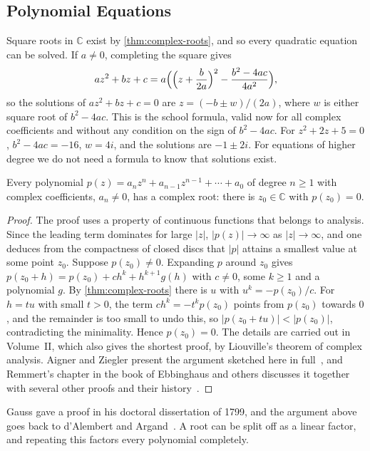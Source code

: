 \subsection{Polynomial Equations}

Square roots in $\mathbb C$ exist by \cref{thm:complex-roots}, and so every quadratic equation can be solved. If $a\ne0$, completing the square gives
\[
az^2+bz+c=a\Bigl(\Bigl(z+\frac b{2a}\Bigr)^2-\frac{b^2-4ac}{4a^2}\Bigr),
\]
so the solutions of $az^2+bz+c=0$ are $z=(-b\pm w)/(2a)$, where $w$ is either square root of $b^2-4ac$. This is the school formula, valid now for all complex coefficients and without any condition on the sign of $b^2-4ac$. For $z^2+2z+5=0$, $b^2-4ac=-16$, $w=4i$, and the solutions are $-1\pm2i$. For equations of higher degree we do not need a formula to know that solutions exist.

\begin{theorem}
\label{thm:fta}
Every polynomial $p(z)=a_nz^n+a_{n-1}z^{n-1}+\cdots+a_0$ of degree $n\ge1$ with complex coefficients, $a_n\ne0$, has a complex root: there is $z_0\in\mathbb C$ with $p(z_0)=0$.
\end{theorem}

\begin{proof}
The proof uses a property of continuous functions that belongs to analysis. Since the leading term dominates for large $|z|$, $|p(z)|\to\infty$ as $|z|\to\infty$, and one deduces from the compactness of closed discs that $|p|$ attains a smallest value at some point $z_0$. Suppose $p(z_0)\ne0$. Expanding $p$ around $z_0$ gives $p(z_0+h)=p(z_0)+ch^k+h^{k+1}g(h)$ with $c\ne0$, some $k\ge1$ and a polynomial $g$. By \cref{thm:complex-roots} there is $u$ with $u^k=-p(z_0)/c$. For $h=tu$ with small $t>0$, the term $ch^k=-t^kp(z_0)$ points from $p(z_0)$ towards $0$, and the remainder is too small to undo this, so $|p(z_0+tu)|<|p(z_0)|$, contradicting the minimality. Hence $p(z_0)=0$. The details are carried out in Volume~II, which also gives the shortest proof, by Liouville's theorem of complex analysis. Aigner and Ziegler present the argument sketched here in full~\cite{aigner2018proofs}, and Remmert's chapter in the book of Ebbinghaus and others discusses it together with several other proofs and their history~\cite{ebbinghaus1991}.
\end{proof}

Gauss gave a proof in his doctoral dissertation of 1799, and the argument above goes back to d'Alembert and Argand~\cite{ebbinghaus1991}. A root can be split off as a linear factor, and repeating this factors every polynomial completely.

